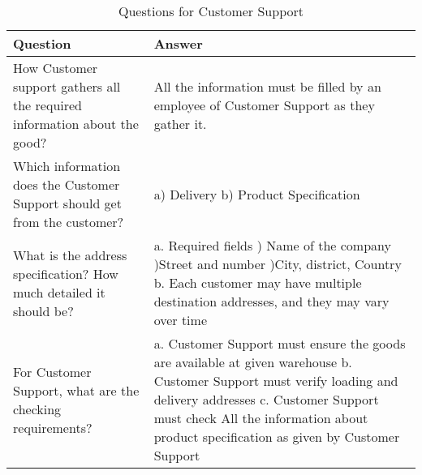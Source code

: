 \documentclass[a4paper]{article}
\begin{document}
        \begin{longtable}[c]{|p{}|p{}|}
           \caption{Questions for Customer Support}
        \label{customerSupportQuestions} \\
        \hline
            Question & Answer \\
            \hline
            \endhead
           How Customer support gathers all the required information about the good? & All the information must be filled by an employee of Customer Support as they gather it. \\
            \hline
           Which information does the Customer Support should get from the customer? & 
           a) Delivery \newline 
           b) Product Specification \\
           \hline
           What is the address specification? How much detailed it should be? & 
           a. Required fields \newline 
           1) Name of the company \newline 
           2)Street and number \newline 
           3)City, district, Country \newline 
           b. Each customer may have multiple destination addresses, and they may vary over time \\
           \hline
            For Customer Support, what are the checking requirements? &
            a. Customer Support must ensure the goods are available at given warehouse \newline
            b. Customer Support must verify loading and delivery addresses \newline 
            c. Customer Support must check All the information about product specification as given by Customer Support \\
            \hline
     
    \end{longtable}

    
   
\end{document}

